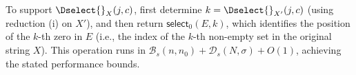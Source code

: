 \noindent To support $\Dselect{}_X(j, c)$, first determine $k = \Dselect{}_{X'}(j, c)$ (using reduction (i) on $X'$), and then return $\textsf{select}_0(E, k)$, which identifies the position of the $k$-th zero in $E$ (i.e., the index of the $k$-th non-empty set in the original string $X$). This operation runs in $\mathcal{B}_s(n, n_0) + \mathcal{D}_s(N, \sigma) + O(1)$, achieving the stated performance bounds.



